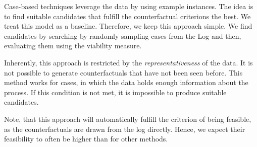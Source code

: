 \documentclass[./../../paper.tex]{subfiles}
\begin{document}
Case-based techniques leverage the data by using example instances. The idea is to find suitable candidates that fulfill the counterfactual criterions the best. We treat this model as a baseline. Therefore, we keep this approach simple. We find candidates by searching by randomly sampling cases from the Log and then, evaluating them using the viability measure.

Inherently, this approach is restricted by the \emph{representativeness} of the data. It is not possible to generate counterfactuals that have not been seen before. This method works for cases, in which the data holds enough information about the process. If this condition is not met, it is impossible to produce suitable candidates.

Note, that this approach will automatically fulfill the criterion of being feasible, as the counterfactuals are drawn from the log directly. Hence, we expect their feasibility to often be higher than for other methods.
\end{document}
